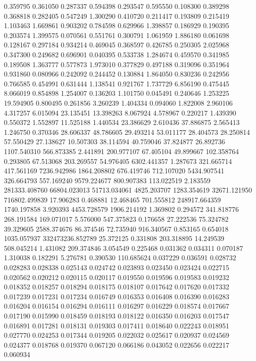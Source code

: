 0.359795
0.361050
0.287337
0.594398
0.293547
0.595550
0.108300
0.389298
0.368818
0.282405
0.547249
1.300290
0.410720
0.211417
0.193809
0.215419
1.103463
1.669861
0.903202
0.784598
0.629966
1.398857
0.186929
0.190395
0.203574
1.399575
0.070561
0.551761
0.300791
1.061959
1.886180
0.061698
0.128167
0.297184
0.934214
0.469045
0.368597
0.426785
0.250305
2.025968
0.347300
0.249682
0.696901
0.040395
0.533738
1.284674
0.459570
0.341985
0.189508
1.363777
0.577873
1.973010
0.377829
0.497188
0.319096
0.351964
0.931860
0.080966
0.242092
0.244452
0.130884
1.864050
0.830236
0.242956
0.766585
0.454991
0.631444
1.138541
0.921767
1.737729
6.856190
0.475445
8.066019
0.854898
1.254007
0.136203
1.101750
0.045491
0.240646
1.253225
19.594905
0.800495
0.261856
3.260239
1.404334
0.094060
1.822008
2.960106
4.317257
6.015094
23.135451
13.398263
8.067924
4.578967
0.220217
1.439390
0.550372
1.552897
11.525188
1.440534
23.386629
2.610436
37.886875
2.565413
1.246750
0.370346
28.606337
48.786605
29.493214
53.011177
28.404573
28.250814
57.550429
27.138627
10.507303
38.114594
40.759046
37.824877
26.892736
1107.540310
566.873385
2.441891
200.977107
67.405104
49.899667
102.358764
0.293805
67.513068
203.269557
54.976405
6302.441357
1.287673
321.665714
417.561169
7236.942986
1864.208802
676.419746
712.107020
5434.907541
326.664793
557.169240
9579.224677
800.907383
113.022519
2.183559
281333.408760
66804.023013
51713.034061
4825.203707
1283.354619
32671.121950
716802.499839
17.906283
0.468881
12.468465
701.555812
248917.664359
1740.197858
3.920393
4453.728579
1906.214192
1.369802
0.294572
341.818776
268.191584
169.071017
5.576000
547.375823
0.176658
27.222536
75.324782
39.329605
2588.374676
86.374546
72.735940
916.340567
0.853165
0.654018
1035.057937
332473236.852789
25.372125
0.331808
203.318895
14.249539
508.045214
1.431082
209.374846
3.054549
0.225468
0.031362
0.034311
0.070187
1.310038
0.182291
5.276781
0.390530
110.685624
0.037229
0.036591
0.028732
0.028283
0.028338
0.025143
0.024742
0.023893
0.023450
0.023424
0.022715
0.020562
0.020212
0.020115
0.020117
0.019550
0.019596
0.019583
0.019232
0.018352
0.018257
0.018294
0.018175
0.018107
0.017642
0.017620
0.017332
0.017239
0.017231
0.017234
0.016749
0.016353
0.016408
0.016390
0.016283
0.016204
0.016154
0.016294
0.016111
0.016297
0.016229
0.018574
0.017667
0.017190
0.015990
0.018459
0.018193
0.018122
0.016350
0.016203
0.017547
0.016891
0.017281
0.018131
0.019303
0.017411
0.018640
0.022243
0.018951
0.027770
0.024253
0.017344
0.019205
0.022032
0.025617
0.020937
0.024569
0.024377
0.018768
0.019370
0.067120
0.066186
0.043052
0.022656
0.022217
0.060934
